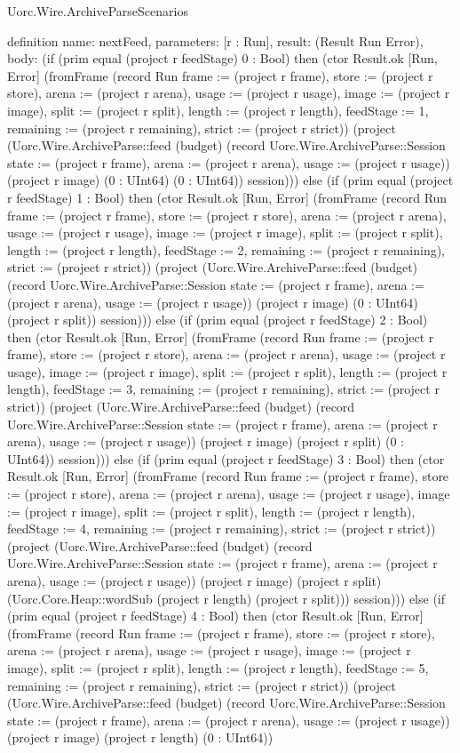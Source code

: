 \begin{lexlean}{Uorc.Wire.ArchiveParseScenarios}
\begin{semanticmodule}
definition{
  name: nextFeed,
  parameters: [r : Run],
  result: (Result Run Error),
  body: (if (prim equal (project r feedStage) 0 : Bool) then (ctor Result.ok [Run, Error] (fromFrame (record Run {frame := (project r frame), store := (project r store), arena := (project r arena), usage := (project r usage), image := (project r image), split := (project r split), length := (project r length), feedStage := 1, remaining := (project r remaining), strict := (project r strict)}) (project (Uorc.Wire.ArchiveParse::feed (budget) (record Uorc.Wire.ArchiveParse::Session {state := (project r frame), arena := (project r arena), usage := (project r usage)}) (project r image) (0 : UInt64) (0 : UInt64)) session))) else (if (prim equal (project r feedStage) 1 : Bool) then (ctor Result.ok [Run, Error] (fromFrame (record Run {frame := (project r frame), store := (project r store), arena := (project r arena), usage := (project r usage), image := (project r image), split := (project r split), length := (project r length), feedStage := 2, remaining := (project r remaining), strict := (project r strict)}) (project (Uorc.Wire.ArchiveParse::feed (budget) (record Uorc.Wire.ArchiveParse::Session {state := (project r frame), arena := (project r arena), usage := (project r usage)}) (project r image) (0 : UInt64) (project r split)) session))) else (if (prim equal (project r feedStage) 2 : Bool) then (ctor Result.ok [Run, Error] (fromFrame (record Run {frame := (project r frame), store := (project r store), arena := (project r arena), usage := (project r usage), image := (project r image), split := (project r split), length := (project r length), feedStage := 3, remaining := (project r remaining), strict := (project r strict)}) (project (Uorc.Wire.ArchiveParse::feed (budget) (record Uorc.Wire.ArchiveParse::Session {state := (project r frame), arena := (project r arena), usage := (project r usage)}) (project r image) (project r split) (0 : UInt64)) session))) else (if (prim equal (project r feedStage) 3 : Bool) then (ctor Result.ok [Run, Error] (fromFrame (record Run {frame := (project r frame), store := (project r store), arena := (project r arena), usage := (project r usage), image := (project r image), split := (project r split), length := (project r length), feedStage := 4, remaining := (project r remaining), strict := (project r strict)}) (project (Uorc.Wire.ArchiveParse::feed (budget) (record Uorc.Wire.ArchiveParse::Session {state := (project r frame), arena := (project r arena), usage := (project r usage)}) (project r image) (project r split) (Uorc.Core.Heap::wordSub (project r length) (project r split))) session))) else (if (prim equal (project r feedStage) 4 : Bool) then (ctor Result.ok [Run, Error] (fromFrame (record Run {frame := (project r frame), store := (project r store), arena := (project r arena), usage := (project r usage), image := (project r image), split := (project r split), length := (project r length), feedStage := 5, remaining := (project r remaining), strict := (project r strict)}) (project (Uorc.Wire.ArchiveParse::feed (budget) (record Uorc.Wire.ArchiveParse::Session {state := (project r frame), arena := (project r arena), usage := (project r usage)}) (project r image) (project r length) (0 : UInt64)) }
\end{semanticmodule}
\end{lexlean}
